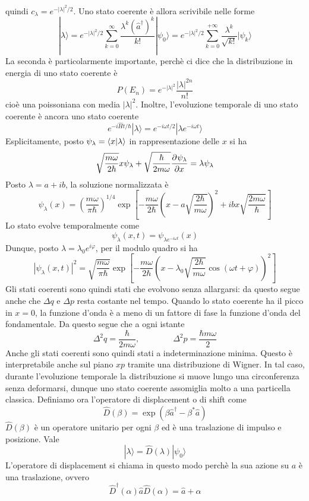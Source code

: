 \documentclass[a4paper, 11pt]{article}
\newcommand{\ham}{\hat{H}}
\renewcommand{\ket}[1]{| #1\rangle}
\begin{document}
quindi $c_\lambda=e^{-|\lambda|^2/2}$. Uno stato coerente è allora scrivibile nelle forme
\[\ket\lambda=e^{-|\lambda|^2/2}\sum_{k=0}^{\infty}\frac{\lambda^k(\hat a^\dagger)^k}{k!}\ket{\psi_0}=e^{-|\lambda|^2/2}\sum_{k=0}^{+\infty}\frac{\lambda^k}{\sqrt{k!}}\ket {\psi_k}\]
La seconda è particolarmente importante, perchè ci dice che la distribuzione in energia di uno stato coerente è
\[P(E_n)=e^{-|\lambda|^2}\frac{|\lambda|^{2n}}{n!}\]
cioè una poissoniana con media $|\lambda|^2$. Inoltre, l'evoluzione temporale di uno stato coerente è ancora uno stato coerente
\[e^{-i\ham t/\hbar}\ket\lambda=e^{-i\omega t/2}\ket{\lambda e^{-i\omega t}}\]
Esplicitamente, posto $\psi_\lambda=\langle x\vert\lambda\rangle$ in rappresentazione delle $x$ si ha
\[\sqrt{\frac{m\omega}{2\hbar}}x\psi_\lambda+\sqrt{\frac{\hbar}{2m\omega}}\dfrac{\partial ^{}\psi_\lambda}{\partial {x}^{}}=\lambda\psi_\lambda\]
Posto $\lambda=a+ib$, la soluzione normalizzata è
\[\psi_\lambda(x)=\left(\frac{m\omega}{\pi\hbar}\right)^{1/4}\exp\left[-\frac{m\omega}{2\hbar}\left(x-a\sqrt{\frac{2\hbar}{m\omega}}\right)^2+ibx\sqrt{\frac{2m\omega}{\hbar}}\right]\]
Lo stato evolve temporalmente come
\[\psi_\lambda(x,t)=\psi_{\lambda e^{-i\omega t}}(x)\]
Dunque, posto $\lambda=\lambda_0e^{i\varphi}$, per il modulo quadro si ha
\[|\psi_\lambda(x,t)|^2=\sqrt{\frac{m\omega}{\pi\hbar}}\exp\left[-\frac{m\omega}{2\hbar}\left(x-\lambda_0\sqrt{\frac{2\hbar}{m\omega}}\cos(\omega t+\varphi)\right)^2\right]\]
Gli stati coerenti sono quindi stati che evolvono senza allargarsi: da questo segue anche che $\Delta q$ e $\Delta p$ resta costante nel tempo. Quando lo stato coerente ha il picco in $x=0$, la funzione d'onda è a meno di un fattore di fase la funzione d'onda del fondamentale. Da questo segue che a ogni istante
\[\Delta^2q=\frac{\hbar}{2m\omega},\quad\quad\quad\quad\Delta^2p=\frac{\hbar m\omega}{2}\]
Anche gli stati coerenti sono quindi stati a indeterminazione minima. Questo è interpretabile anche sul piano $xp$ tramite una distribuzione di Wigner. In tal caso, durante l'evoluzione temporale la distribuzione si muove lungo una circonferenza senza deformarsi, dunque uno stato coerente assomiglia molto a una particella classica. Definiamo ora l'operatore di displacement o di shift come
\[\hat D(\beta)=\exp(\beta \hat a^\dagger-\beta^*\hat a)\]
$\hat D(\beta)$ è un operatore unitario per ogni $\beta$ ed è una traslazione di impulso e posizione. Vale
\[\ket\lambda=\hat D(\lambda)\ket{\psi_0}\]
L'operatore di displacement si chiama in questo modo perchè la sua azione su $a$ è una traslazione, ovvero
\[\hat D^\dagger(\alpha)\hat a\hat D(\alpha)=\hat a+\alpha\]
\end{document}
